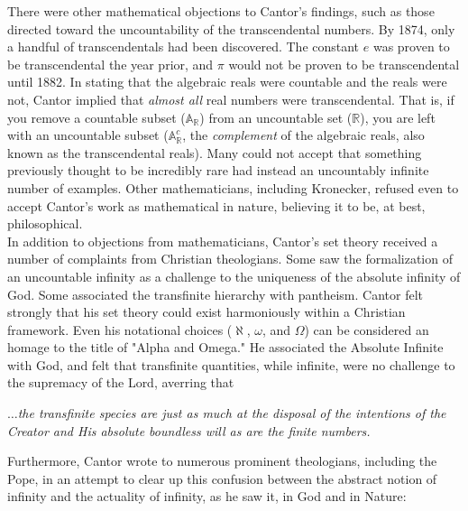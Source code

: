 \begin{tcolorbox}[breakable, enhanced, colback=textbook-blue, sharp corners]
	There were other mathematical objections to Cantor's findings, such as those directed toward the uncountability of the transcendental numbers. By 1874, only a handful of transcendentals had been discovered. The constant $e$ was proven to be transcendental the year prior, and $\pi$ would not be proven to be transcendental until 1882. In stating that the algebraic reals were countable and the reals were not, Cantor implied that \textit{almost all} real numbers were transcendental. That is, if you remove a countable subset ($\mathbb{A}_\mathbb{R}$) from an uncountable set ($\mathbb{R}$), you are left with an uncountable subset ($\mathbb{A}_\mathbb{R}^c$, the \textit{complement} of the algebraic reals, also known as the transcendental reals). Many could not accept that something previously thought to be incredibly rare had instead an uncountably infinite number of examples. Other mathematicians, including Kronecker, refused even to accept Cantor's work as mathematical in nature, believing it to be, at best, philosophical. \\
	
	In addition to objections from mathematicians, Cantor's set theory received a number of complaints from Christian theologians. Some saw the formalization of an uncountable infinity as a challenge to the uniqueness of the absolute infinity of God. Some associated the transfinite hierarchy with pantheism. Cantor felt strongly that his set theory could exist harmoniously within a Christian framework. Even his notational choices ($\aleph$, $\omega$, and $\Omega$) can be considered an homage to the title of "Alpha and Omega." He associated the Absolute Infinite with God, and felt that transfinite quantities, while infinite, were no challenge to the supremacy of the Lord, averring that \\
	
	\begin{displayquote}
		$\dots$\textit{the transfinite species are just as much at the disposal of the intentions of the Creator and His absolute boundless will as are the finite numbers.}
	\end{displayquote}
	\vspace{4mm}
	
	Furthermore, Cantor wrote to numerous prominent theologians, including the Pope, in an attempt to clear up this confusion between the abstract notion of infinity and the actuality of infinity, as he saw it, in God and in Nature: \\
	

\end{tcolorbox}
